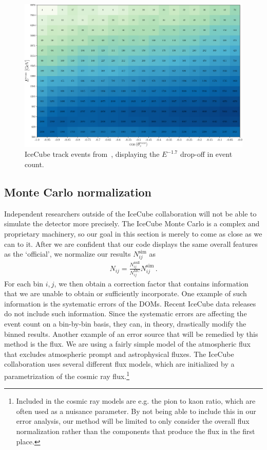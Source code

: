 \begin{figure}[ht]
    \centering
    \includegraphics[scale=0.4]{figures/IC_data.pdf}
    \caption{IceCube track events from~\cite{IC2020}, displaying the $E^{-1.7}$ drop-off in event count.}\label{fig:IC_data}
\end{figure}

\subsection*{Monte Carlo normalization}
Independent researchers outside of the IceCube collaboration will not be able to simulate the detector more precisely.
The IceCube Monte Carlo is a complex and proprietary machinery, so our goal in this 
section is merely to come as close as we can to it. After we are confident that 
our code displays the same overall features as the `official', we normalize our results $N_{ij}^\text{sim}$ as 
\begin{align}\label{eq:MC_norm}
    N_{ij} = \frac{N_{ij}^\text{null}}{N_{ij}^\text{MC}} N_{ij}^\text{sim}\,.
\end{align}
For each bin $i,j$, we then obtain a correction factor that contains information that we are unable
to obtain or sufficiently incorporate. One example of such information is the systematic errors of the DOMs.
Recent IceCube data releases do not include such information. Since the systematic errors are affecting the 
event count on a bin-by-bin basis, they can, in theory, drastically modify the binned results. Another example of
an error source that will be remedied by this method is the flux. We are using a fairly simple model of the atmospheric 
flux that excludes atmospheric prompt and astrophysical fluxes. The IceCube collaboration uses several different flux models, which are initialized 
by a parametrization of the cosmic ray flux.\footnote{Included in the cosmic ray models are e.g. the pion to kaon 
ratio, which are often used as a nuisance parameter. By not being able to include this in our error analysis, our method will 
be limited to only consider the overall flux normalization rather than the components that produce the flux in the first place.}

